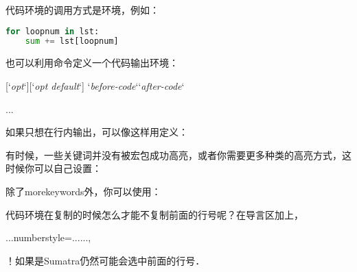 代码环境的调用方式是环境，例如：
\begin{latex}
\begin{lstlisting}[language=Python]
for loopnum in lst:
    sum += lst[loopnum]
\end{lstlisting}
\end{latex}

也可以利用命令定义一个代码输出环境：
\begin{latex}
    [`\textit{opt}`][`\textit{opt default}`]
    {`\textit{before-code}`}{`\textit{after-code}`}
\begin{envi-name}...\end{envi-name}
\end{latex}

如果只想在行内输出，可以像这样用定义：
\begin{latex}
\newcommand{\inlatexline}[1]{{\lstinline
    [language=TeX,basicstyle=\small\ttfamily]{#1}}}
\end{latex}

有时候，一些关键词并没有被宏包成功高亮，或者你需要更多种类的高亮方式，这时候你可以自己设置：
\begin{latex}
\end{latex}

除了morekeywords外，你可以使用：
\begin{latex}
\lstdefinestyle{...}{
    morecomment=[l]{//}, %
    morecomment=[s]{/*}{*/}, %
    morecomment=[n]{(*}{*)}, %
    morestring=[b]", %
\end{latex}

代码环境在复制的时候怎么才能不复制前面的行号呢？在导言区加上，
\begin{latex}
\usepackage{accsupp}
\newcommand{\emptyaccsupp}[1]
    {#1\EndAccSupp{}}
...numberstyle=...\emptyaccsupp...,
\end{latex}

！如果是Sumatra仍然可能会选中前面的行号．

